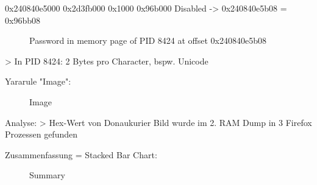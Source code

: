 				0x240840e5000	0x2d3fb000	0x1000	0x96b000	Disabled
					-> 0x240840e5b08 = 0x96bb08
					\begin{figure}[h!]
						\centerline{}
						\label{chart:final-criteria}  
						\caption{Password in memory page of PID 8424 at offset 0x240840e5b08}
					\end{figure}
		> In PID 8424: 2 Bytes pro Character, bspw. Unicode
				
Yararule "Image":
	\begin{figure}[h!]
		\centerline{}
		\label{chart:final-criteria}  
		\caption{Image}
	\end{figure}
	Analyse:
		> Hex-Wert von Donaukurier Bild wurde im 2. RAM Dump in 3 Firefox Prozessen gefunden
	

Zusammenfassung = Stacked Bar Chart:
\begin{figure}[h!]
	\centerline{}
	\label{chart:final-criteria}  
	\caption{Summary}
\end{figure}

